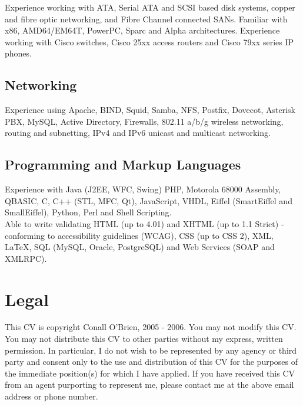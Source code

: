 \documentclass[a4paper, 11pt] {article}
\begin{document}
Experience working with ATA, Serial ATA and SCSI based disk systems, 
copper and fibre optic networking, and Fibre Channel connected SANs. 
Familiar with x86, AMD64/EM64T, PowerPC, Sparc and Alpha architectures. 
Experience working with Cisco switches, Cisco 25xx access routers and 
Cisco 79xx series IP phones.

\subsection*{Networking}

Experience using Apache, BIND, Squid, Samba, NFS, Postfix, Dovecot,
Asterisk PBX, MySQL, Active  Directory, Firewalls, 802.11 a/b/g wireless 
networking, routing and subnetting, IPv4 and IPv6 unicast and multicast 
networking.
 

\subsection*{Programming and Markup Languages}

Experience with Java (J2EE, WFC, Swing) PHP, Motorola 68000 Assembly, QBASIC,
C, C++ (STL, MFC, Qt), JavaScript, VHDL, Eiffel (SmartEiffel and 
SmallEiffel), Python, Perl and Shell Scripting. \\

Able to write validating HTML (up to 4.01) and XHTML (up 
to 1.1 Strict) - conforming to accessibility guidelines (WCAG), CSS (up to 
CSS 2), XML, LaTeX, SQL (MySQL, Oracle, PostgreSQL) and Web Services 
(SOAP and XMLRPC).

\section*{Legal}

This CV is copyright Conall O'Brien, 2005 - 2006. You may not modify 
this CV. You may not distribute this CV to other parties without my 
express, written permission. In particular, I do not wish to be 
represented by any agency or third party and consent only to the use 
and distribution of this CV for the purposes of the immediate 
position(s) for which I have applied. If you have received this CV from 
an agent purporting to represent me, please contact me at the above 
email address or phone number.
\end{document}
